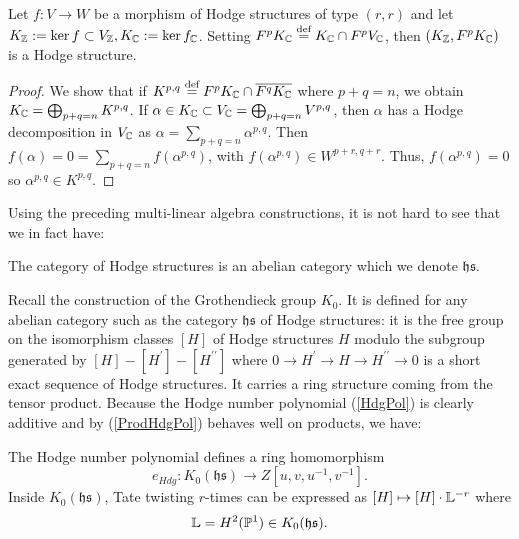 \documentclass[../main.tex]{subfiles}
\begin{document}
 \begin{lemma}
     Let $f \colon V \to W $ be a morphism of Hodge structures of type $(r,r)$ and let $K_{\mathbb{Z}} := \ker f \subset V_{\mathbb{Z}}, K_{\mathbb{C}} := \ker f_{\mathbb{C}} $. Setting $F^pK_{\mathbb{C}} \stackrel{\text{def}}{=} K_{\mathbb{C}} \cap F^pV_{\mathbb{C}}$, then $(K_{\mathbb{Z}}, F^p K_{\mathbb{C}})$ is a Hodge structure.
 \end{lemma}
 \begin{proof}
     We show that if $K^{p,q} \stackrel{\text{def}}{=} F^pK_{\mathbb{C}} \cap \overline{F^q K_{\mathbb{C}}}$ where $p+q=n$, we obtain $K_{\mathbb{C}} = \bigoplus_{p+q=n} K^{p,q}$. If $\alpha \in K_{\mathbb{C}} \subset V_{\mathbb{C}} = \bigoplus_{p+q=n} V^{p,q}$, then $\alpha$ has a Hodge decomposition in $V_{\mathbb{C}}$ as $\alpha = \sum_{p+q=n} \alpha^{p,q}$. Then $f(\alpha)=0=\sum_{p+q=n}f(\alpha^{p,q})$, with  $f(\alpha^{p,q}) \in W^{p+r,q+r}$. Thus, $f(\alpha^{p,q})=0$ so $\alpha^{p,q} \in K^{p,q}$.
 \end{proof}

 
 Using the preceding multi-linear algebra constructions, it is not hard to see that we in fact have:
\begin{cor}
    The category of Hodge structures is an abelian category
which we denote $\mathfrak{hs}$.
\end{cor}
Recall the construction of the Grothendieck group $K_0$. 
It is defined for any abelian category such as the category $\mathfrak{hs}$ of Hodge structures: it is the free group on the isomorphism classes $[H]$ of Hodge structures $H$ modulo
the subgroup generated by $[H] - [H^\prime] - [H^{\prime\prime}]$ where $0 \to H^\prime \to H \to H^{\prime\prime} \to 0$ is a short exact sequence of Hodge structures. It carries a ring structure coming from the tensor product. Because the Hodge number polynomial (\ref{HdgPol}) is
clearly additive and by (\ref{ProdHdgPol}) behaves well on products, we have: 
\begin{lemma}
    The Hodge number polynomial defines a ring homomorphism
    \[
    e_{Hdg} \colon K_0(\mathfrak{hs}) \to Z[u, v, u^{-1},v^{-1}].
    \]
Inside $K_0(\mathfrak{hs})$, Tate twisting $r$-times can be expressed as $[H] \mapsto [H] \cdot  \mathbb{L}^{-r}$ where
\begin{align}
    \mathbb{L} = H^2(\mathbb{P}^1) \in K_0(\mathfrak{hs}). \label{L}
\end{align}
\end{lemma} 
\end{document}
